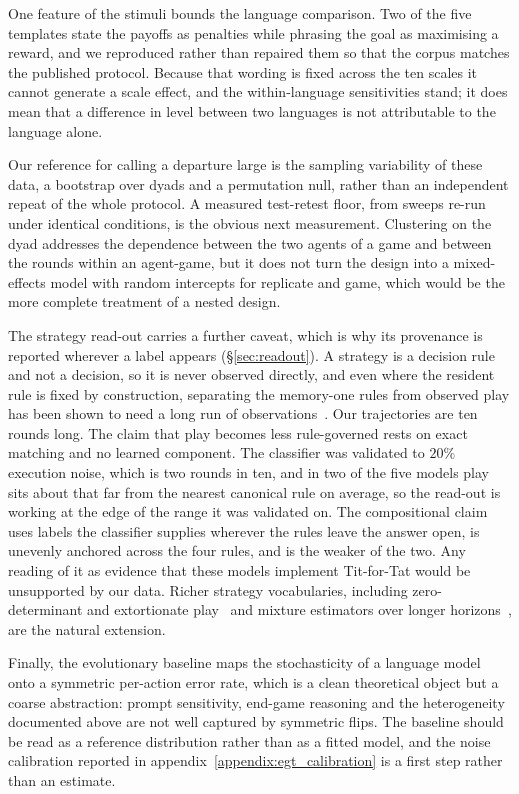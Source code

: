 \documentclass[openacc]{rsproca_new}
\begin{document}
One feature of the stimuli bounds the language comparison. Two of the five
templates state the payoffs as penalties while phrasing the goal as maximising
a reward, and we reproduced rather than repaired them so that the corpus
matches the published protocol. Because that wording is fixed across the ten
scales it cannot generate a scale effect, and the within-language sensitivities
stand; it does mean that a difference in level between two languages is not
attributable to the language alone.

Our reference for calling a departure large is the sampling variability of
these data, a bootstrap over dyads and a permutation null, rather than an
independent repeat of the whole protocol. A measured test-retest floor, from
sweeps re-run under identical conditions, is the obvious next measurement.
Clustering on the dyad addresses the dependence between the two agents of a
game and between the rounds within an agent-game, but it does not turn the
design into a mixed-effects model with random intercepts for replicate and
game, which would be the more complete treatment of a nested design.

The strategy read-out carries a further caveat, which is why its provenance is
reported wherever a label appears (\S\ref{sec:readout}). A strategy is a
decision rule and not a decision, so it is never observed directly, and even
where the resident rule is fixed by construction, separating the memory-one
rules from observed play has been shown to need a long run of
observations~\cite{kim2021win}. Our trajectories are ten rounds long. The claim
that play becomes less rule-governed rests on exact matching and no learned
component. The classifier was validated to $20\%$ execution noise, which is two
rounds in ten, and in two of the five models play sits about that far from the
nearest canonical rule on average, so the read-out is working at the edge of
the range it was validated on. The compositional claim uses labels the
classifier supplies wherever the rules leave the answer open, is unevenly
anchored across the four rules, and is the weaker of the two. Any reading of it
as evidence that these models implement Tit-for-Tat would be unsupported by our
data. Richer strategy vocabularies, including zero-determinant and extortionate
play~\cite{pressDyson2012,hilbe2013memory} and mixture estimators over longer
horizons~\cite{fontana2025nicer,inferenceStrategies}, are the natural extension.

Finally, the evolutionary baseline maps the stochasticity of a language model
onto a symmetric per-action error rate, which is a clean theoretical object but
a coarse abstraction: prompt sensitivity, end-game reasoning and the
heterogeneity documented above are not well captured by symmetric flips. The
baseline should be read as a reference distribution rather than as a fitted
model, and the noise calibration reported in
appendix~\ref{appendix:egt_calibration} is a first step rather than an
estimate.
\end{document}
